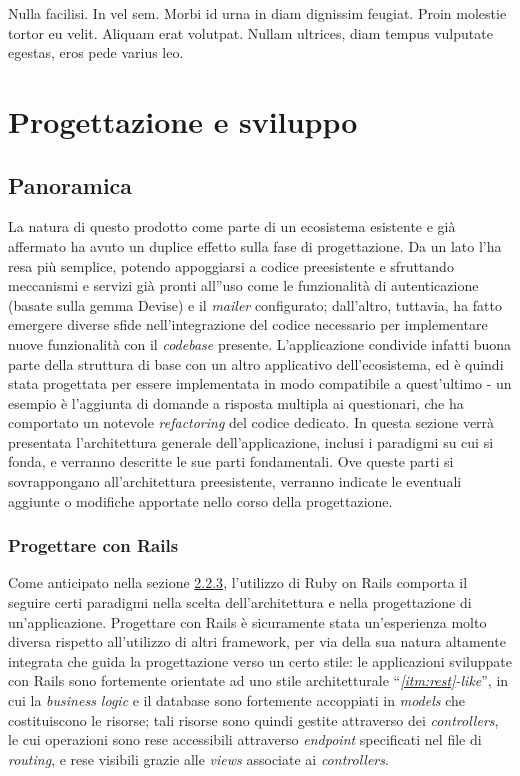 

\begin{savequote}[75mm]
Nulla facilisi. In vel sem. Morbi id urna in diam dignissim feugiat. Proin molestie tortor eu velit. Aliquam erat volutpat. Nullam ultrices, diam tempus vulputate egestas, eros pede varius leo.
\end{savequote}

\chapter{Progettazione e sviluppo}
\section{Panoramica}
La natura di questo prodotto come parte di un ecosistema esistente e già affermato ha avuto un duplice effetto sulla fase di progettazione. Da un lato l'ha resa più semplice, potendo appoggiarsi a codice preesistente e sfruttando meccanismi e servizi già pronti all''uso come le funzionalità di autenticazione (basate sulla gemma Devise) e il \textit{mailer} configurato; dall'altro, tuttavia, ha fatto emergere diverse sfide nell'integrazione del codice necessario per implementare nuove funzionalità con il \textit{codebase} presente. L'applicazione condivide infatti buona parte della struttura di base con un altro applicativo dell'ecosistema, ed è quindi stata progettata per essere implementata in modo compatibile a quest'ultimo - un esempio è l'aggiunta di domande a risposta multipla ai questionari, che ha comportato un notevole \textit{refactoring} del codice dedicato.
In questa sezione verrà presentata l'architettura generale dell'applicazione, inclusi i paradigmi su cui si fonda, e verranno descritte le sue parti fondamentali. Ove queste parti si sovrappongano all'architettura preesistente, verranno indicate le eventuali aggiunte o modifiche apportate nello corso della progettazione.

\subsection{Progettare con Rails}
Come anticipato nella sezione \hyperref[sec:2.2.3]{2.2.3}, l'utilizzo di Ruby on Rails comporta il seguire certi paradigmi nella scelta dell'architettura e nella progettazione di un'applicazione. Progettare con Rails è sicuramente stata un'esperienza molto diversa rispetto all'utilizzo di altri framework, per via della sua natura altamente integrata che guida la progettazione verso un certo stile: le applicazioni sviluppate con Rails sono fortemente orientate ad uno stile architetturale ``\textit{\ref{itm:rest}-like}'', in cui la \textit{business logic} e il database sono fortemente accoppiati in \textit{models} che costituiscono le risorse; tali risorse sono quindi gestite attraverso dei \textit{controllers}, le cui operazioni sono rese accessibili attraverso \textit{endpoint} specificati nel file di \textit{routing}, e rese visibili grazie alle \textit{views} associate ai \textit{controllers}.

